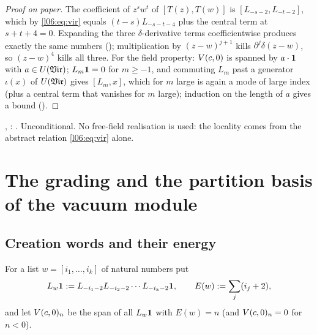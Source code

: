 \begin{proof}[Proof on paper]
The coefficient of $z^sw^t$ of $[T(z),T(w)]$ is $[L_{-s-2},L_{-t-2}]$, which by \eqref{l06:eq:vir}
equals $(t-s)L_{-s-t-4}$ plus the central term at $s+t+4 = 0$. Expanding the three
$\delta$-derivative terms coefficientwise produces exactly the same numbers
(); multiplication by $(z-w)^{j+1}$ kills $\partial^j\delta(z-w)$, so
$(z-w)^4$ kills all three. For the field property: $V(c,0)$ is spanned by $a\cdot\mathbf{1}$ with
$a\in U(\mathfrak{Vir})$; $L_m\mathbf{1} = 0$ for $m\ge-1$, and commuting $L_m$ past a generator $\iota(x)$ of
$U(\mathfrak{Vir})$ gives $[L_m,x]$, which for $m$ large is again a mode of large index (plus a central term that
vanishes for $m$ large); induction on the length of $a$ gives a bound ().
\end{proof}

\begin{status}
\allowbreak{}\allowbreak{}\allowbreak{}\allowbreak{}, \allowbreak{}\allowbreak{}\allowbreak{}:
\lean{[propext, Classical.}\allowbreak{}\allowbreak\lean{sound]}. Unconditional. No free-field realisation is used: the
locality comes from the abstract relation \eqref{l06:eq:vir} alone.
\end{status}

\section{The grading and the partition basis of the vacuum module}\label{l06:sec:basis}

\subsection{Creation words and their energy}

\begin{definition}\label{l06:def:grading}
For a list $w = [i_1,\dots,i_k]$ of natural numbers put
\begin{equation*}
 L_w\mathbf{1} := L_{-i_1-2}L_{-i_2-2}\cdots L_{-i_k-2}\mathbf{1},\qquad
 E(w) := \sum_j(i_j+2),
\end{equation*}
and let $V(c,0)_n$ be the span of all $L_w\mathbf{1}$ with $E(w) = n$ (and $V(c,0)_n = 0$ for $n<0$).
\end{definition}

